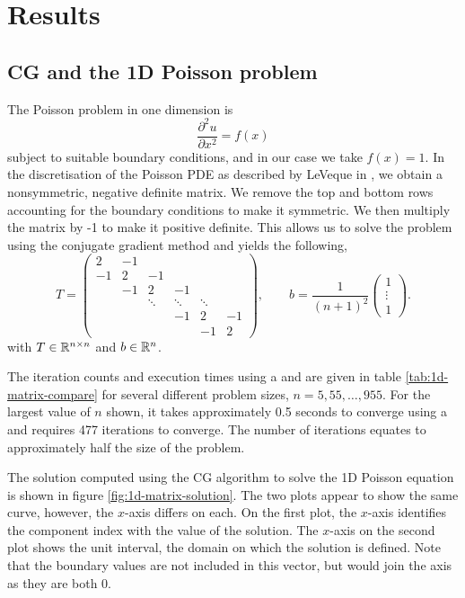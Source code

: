 \section{Results}

\subsection{CG and the 1D Poisson problem}

The Poisson problem in one dimension is
\[
	\frac{\partial^2 u}{\partial x^2} = f(x)
\]
subject to suitable boundary conditions, and in our case we take $f(x)=1$.
In the discretisation of the Poisson PDE as described by LeVeque in \cite{finitediff}, we obtain a nonsymmetric, negative definite matrix.
We remove the top and bottom rows accounting for the boundary conditions to make it symmetric.
We then multiply the matrix by -1 to make it positive definite.
This allows us to solve the problem using the conjugate gradient method and yields the following,
\[
T = \begin{pmatrix}
	2 & -1 & & & & \\
    -1 & 2 & -1 &&& \\
    & -1 & 2 & -1 && \\
    & & \ddots & \ddots & \ddots & \\
    & & & -1 & 2 & -1 \\
    & & & & -1 & 2
\end{pmatrix},
\qquad
b = \frac{1}{(n+1)^2}\begin{pmatrix}
	1 \\ \vdots \\ 1
\end{pmatrix}.
\]
with $T\in\mathbb{R}^{n\times n}$ and $b\in\mathbb{R}^n$.

The iteration counts and execution times using a  and  are given in table \ref{tab:1d-matrix-compare} for several different problem sizes, $n=5,55,\ldots,955$. 
For the largest value of $n$ shown, it takes approximately 0.5 seconds to converge using a  and requires 477 iterations to converge.
The number of iterations equates to approximately half the size of the problem.

The solution computed using the CG algorithm to solve the 1D Poisson equation is shown in figure \ref{fig:1d-matrix-solution}.
The two plots appear to show the same curve, however, the $x$-axis differs on each.
On the first plot, the $x$-axis identifies the component index with the value of the solution.
The $x$-axis on the second plot shows the unit interval, the domain on which the solution is defined.
Note that the boundary values are not included in this vector, but would join the axis as they are both 0.

